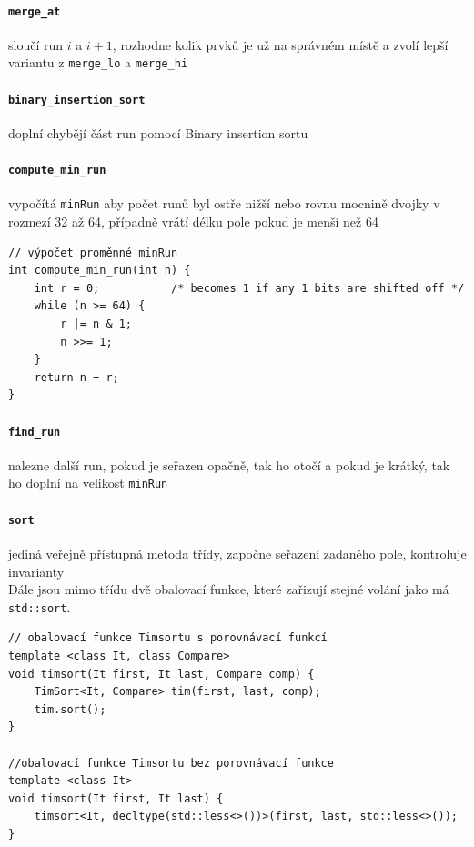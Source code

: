 \documentclass[thesis=B,czech]{FITthesis}[2019/12/23]
\begin{document}
\paragraph{\texttt{merge\_at}}{sloučí run $ i $ a $ i + 1 $, rozhodne kolik prvků je už na správném místě a zvolí lepší variantu z \texttt{merge\_lo} a \texttt{merge\_hi}}
\paragraph{\texttt{binary\_insertion\_sort}}{doplní chybějí část run pomocí Binary insertion sortu}
\paragraph{\texttt{compute\_min\_run}}{vypočítá \texttt{minRun} aby počet runů byl ostře nižší nebo rovnu mocnině dvojky v rozmezí 32 až 64, případně vrátí délku pole pokud je menší než 64}
\begin{verbatim}
// výpočet proměnné minRun
int compute_min_run(int n) {
    int r = 0;           /* becomes 1 if any 1 bits are shifted off */
    while (n >= 64) {
        r |= n & 1;
        n >>= 1;
    }
    return n + r;
}
\end{verbatim}
\paragraph{\texttt{find\_run}}{nalezne další run, pokud je seřazen opačně, tak ho otočí a pokud je krátký, tak ho doplní na velikost \texttt{minRun}}
\paragraph{\texttt{sort}}{jediná veřejně přístupná metoda třídy, započne seřazení zadaného pole, kontroluje invarianty}\\[10pt]

\noindent Dále jsou mimo třídu dvě obalovací funkce, které zařizují stejné volání jako má \texttt{std::sort}.

\begin{verbatim}
// obalovací funkce Timsortu s porovnávací funkcí
template <class It, class Compare>
void timsort(It first, It last, Compare comp) {
    TimSort<It, Compare> tim(first, last, comp);
    tim.sort();
}

//obalovací funkce Timsortu bez porovnávací funkce
template <class It>
void timsort(It first, It last) {
    timsort<It, decltype(std::less<>())>(first, last, std::less<>());
}
\end{verbatim}
\end{document}
